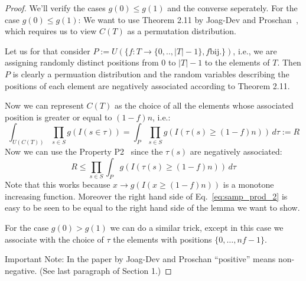 \documentclass{article}
\theoremstyle{definition}
\begin{document}
\begin{proof}
We'll verify the cases $g(0) \leq g(1)$ and the converse seperately. For the case $g(0) \leq g(1)$:
We want to use Theorem 2.11 by Joag-Dev and Proschan~\cite{joagdev1983}, which requires us to view $C(T)$ as a permutation distribution.

Let us for that consider $P := U(\{f : T \rightarrow \{0,..,|T|-1\}, f \textrm{bij.}\})$, i.e., we are assigning randomly distinct positions from $0$ to $|T|-1$ to the elements
of $T$. Then $P$ is clearly a permuation distribution and the random variables describing the positions of each element are negatively associated according to Theorem 2.11.

Now we can represent $C(T)$ as the choice of all the elements whose associated position is greater or equal to $(1-f)n$, i.e.:
\begin{equation*}
  \int_{U(C(T))} \prod_{s \in S} g(I(s \in \tau)) = \int_P \prod_{s \in S} g(I(\tau(s) \geq (1-f)n)) \, d\tau := R
\end{equation*}
Now we can use the Property P2~\cite[Page 288]{joagdev1983} since the $\tau(s)$ are negatively associated:
\begin{equation}\label{eq:samp_prod_2}
  R \leq \prod_{s \in S} \int_P g(I(\tau(s) \geq (1-f)n)) \, d\tau
\end{equation}
Note that this works because $x \rightarrow g(I(x \geq (1-f)n))$ is a monotone increasing function.
Moreover the right hand side of Eq.~\ref{eq:samp_prod_2} is easy to be seen to be equal to the right hand side of the lemma we want to show.

For the case $g(0) > g(1)$ we can do a similar trick, except in this case we associate with the choice of $\tau$ the elements with positions $\{0,\ldots,nf-1\}$.

Important Note: In the paper by Joag-Dev and Proschan ``positive'' means non-negative. (See last paragraph of Section 1.)
\end{proof}
\end{document}
